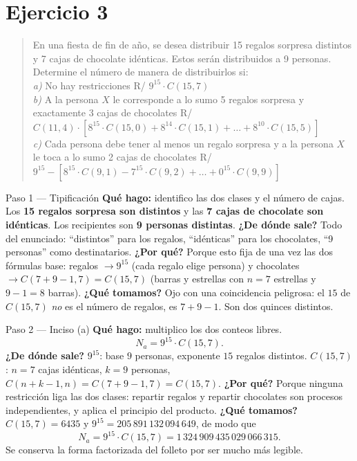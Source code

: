 \documentclass[11pt]{article}
\begin{document}
\section*{Ejercicio 3}

\begin{quote}
En una fiesta de fin de año, se desea distribuir 15 regalos sorpresa distintos y 7 cajas de chocolate idénticas. Estos serán distribuidos a 9 personas. Determine el número de manera de distribuirlos si:\\
\textit{a)} No hay restricciones \hfill R/ $9^{15}\cdot C(15,7)$\\
\textit{b)} A la persona $X$ le corresponde a lo sumo 5 regalos sorpresa y exactamente 3 cajas de chocolates \hfill R/ $C(11,4)\cdot[8^{15}\cdot C(15,0)+8^{14}\cdot C(15,1)+\ldots+8^{10}\cdot C(15,5)]$\\
\textit{c)} Cada persona debe tener al menos un regalo sorpresa y a la persona $X$ le toca a lo sumo 2 cajas de chocolates \hfill R/ $9^{15}-[8^{15}\cdot C(9,1)-7^{15}\cdot C(9,2)+\ldots+0^{15}\cdot C(9,9)]$
\end{quote}

\begin{paso}{Paso 1 --- Tipificación}
\textbf{Qué hago:} identifico las dos clases y el número de cajas.
Los \textbf{15 regalos sorpresa son distintos} y las \textbf{7 cajas de chocolate son idénticas}. Los recipientes son \textbf{9 personas distintas}.
\textbf{¿De dónde sale?} Todo del enunciado: ``distintos'' para los regalos, ``idénticas'' para los chocolates, ``9 personas'' como destinatarios.
\textbf{¿Por qué?} Porque esto fija de una vez las dos fórmulas base: regalos $\to 9^{15}$ (cada regalo elige persona) y chocolates $\to C(7+9-1,7)=C(15,7)$ (barras y estrellas con $n=7$ estrellas y $9-1=8$ barras).
\textbf{¿Qué tomamos?} Ojo con una coincidencia peligrosa: el $15$ de $C(15,7)$ \emph{no} es el número de regalos, es $7+9-1$. Son dos quinces distintos.
\end{paso}

\begin{paso}{Paso 2 --- Inciso (a)}
\textbf{Qué hago:} multiplico los dos conteos libres.
\[
N_a=9^{15}\cdot C(15,7).
\]
\textbf{¿De dónde sale?} $9^{15}$: base $9$ personas, exponente $15$ regalos distintos. $C(15,7)$: $n=7$ cajas idénticas, $k=9$ personas, $C(n+k-1,n)=C(7+9-1,7)=C(15,7)$.
\textbf{¿Por qué?} Porque ninguna restricción liga las dos clases: repartir regalos y repartir chocolates son procesos independientes, y aplica el principio del producto.
\textbf{¿Qué tomamos?} $C(15,7)=6435$ y $9^{15}=205\,891\,132\,094\,649$, de modo que
\[
N_a=9^{15}\cdot C(15,7)=1\,324\,909\,435\,029\,066\,315 .
\]
Se conserva la forma factorizada del folleto por ser mucho más legible.
\end{paso}
\end{document}
